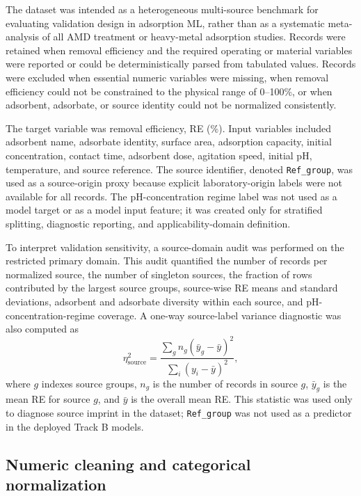 \documentclass[review,12pt,number]{elsarticle}
\begin{document}
The dataset was intended as a heterogeneous multi-source benchmark for evaluating validation design in adsorption ML, rather than as a systematic meta-analysis of all AMD treatment or heavy-metal adsorption studies. Records were retained when removal efficiency and the required operating or material variables were reported or could be deterministically parsed from tabulated values. Records were excluded when essential numeric variables were missing, when removal efficiency could not be constrained to the physical range of 0--100\%, or when adsorbent, adsorbate, or source identity could not be normalized consistently.

The target variable was removal efficiency, RE (\%). Input variables included adsorbent name, adsorbate identity, surface area, adsorption capacity, initial concentration, contact time, adsorbent dose, agitation speed, initial pH, temperature, and source reference. The source identifier, denoted \texttt{Ref\_group}, was used as a source-origin proxy because explicit laboratory-origin labels were not available for all records. The pH-concentration regime label was not used as a model target or as a model input feature; it was created only for stratified splitting, diagnostic reporting, and applicability-domain definition.

To interpret validation sensitivity, a source-domain audit was performed on the restricted primary domain. This audit quantified the number of records per normalized source, the number of singleton sources, the fraction of rows contributed by the largest source groups, source-wise RE means and standard deviations, adsorbent and adsorbate diversity within each source, and pH-concentration-regime coverage. A one-way source-label variance diagnostic was also computed as
\begin{equation}
\eta^2_{\mathrm{source}} = \frac{\sum_g n_g(\bar{y}_g-\bar{y})^2}{\sum_i(y_i-\bar{y})^2},
\end{equation}
where $g$ indexes source groups, $n_g$ is the number of records in source $g$, $\bar{y}_g$ is the mean RE for source $g$, and $\bar{y}$ is the overall mean RE. This statistic was used only to diagnose source imprint in the dataset; \texttt{Ref\_group} was not used as a predictor in the deployed Track B models.

\subsection{Numeric cleaning and categorical normalization}
\end{document}
